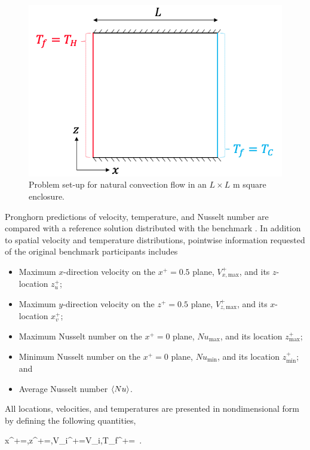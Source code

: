 \begin{figure}[!h]
\centering
\includegraphics[width=0.5\linewidth]{figs/rb_cell.png}
\caption{Problem set-up for natural convection flow in an \(L\times L\) \si{\meter} square enclosure.}
\label{fig:rb_cell}
\end{figure}

Pronghorn predictions of velocity, temperature, and Nusselt number are compared with a reference solution distributed with the benchmark \cite{davis}. In addition to spatial velocity and temperature distributions, pointwise information requested of the original benchmark participants includes

\begin{itemize}
\itemsep0em
\item Maximum \(x\)-direction velocity on the \(x^+=0.5\) plane, \(V^+_{x,\text{max}}\), and its \(z\)-location \(z^+_u\);
\item Maximum \(y\)-direction velocity on the \(z^+=0.5\) plane, \(V^+_{z,\text{max}}\), and its \(x\)-location \(x^+_v\);
\item Maximum Nusselt number on the \(x^+=0\) plane, \(Nu_\text{max}\), and its location \(z^+_\text{max}\);
\item Minimum Nusselt number on the \(x^+=0\) plane, \(Nu_\text{min}\), and its location \(z^+_\text{min}\); and
\item Average Nusselt number \(\langle Nu\rangle\).
\end{itemize}

All locations, velocities, and temperatures are presented in nondimensional form by defining the following quantities,

\beq
\label{eq:nondim_x}
x^+=,\quad z^+=,\quad V_i^+=V_i,\quad T_f^+=\ .
\eeq

